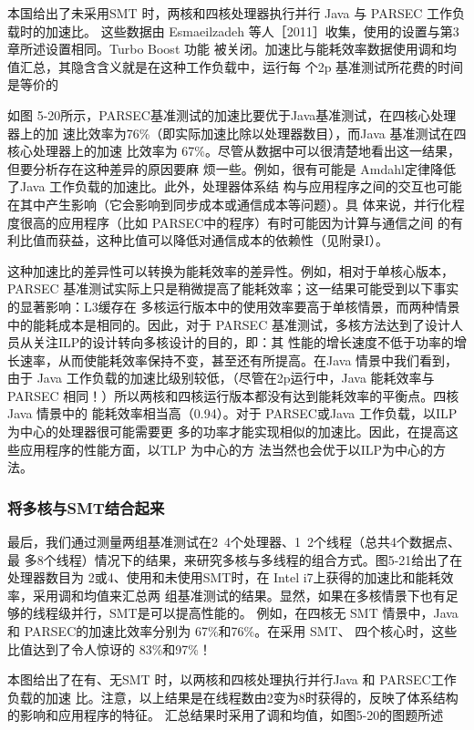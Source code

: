本国给出了未采用SMT 时，两核和四核处理器执行并行 Java 与 PARSEC 工作负载时的加速比。
这些数据由 Esmaeilzadeh 等人［2011］收集，使用的设置与第3章所述设置相同。Turbo Boost 功能
被关闭。加速比与能耗效率数据使用调和均值汇总，其隐含含义就是在这种工作负载中，运行每
个2p 基准测试所花费的时间是等价的

如图 5-20所示，PARSEC基准测试的加速比要优于Java基准测试，在四核心处理器上的加
速比效率为76\%（即实际加速比除以处理器数目），而Java 基准测试在四核心处理器上的加速
比效率为 67\%。尽管从数据中可以很清楚地看出这一结果，但要分析存在这种差异的原因要麻
烦一些。例如，很有可能是 Amdahl定律降低了Java 工作负载的加速比。此外，处理器体系结
构与应用程序之间的交互也可能在其中产生影响（它会影响到同步成本或通信成本等问题）。具
体来说，并行化程度很高的应用程序（比如 PARSEC中的程序）有时可能因为计算与通信之间
的有利比值而获益，这种比值可以降低对通信成本的依赖性（见附录I）。

这种加速比的差异性可以转换为能耗效率的差异性。例如，相对于单核心版本，PARSEC
基准测试实际上只是稍微提高了能耗效率；这一结果可能受到以下事实的显著影响：L3缓存在
多核运行版本中的使用效率要高于单核情景，而两种情景中的能耗成本是相同的。因此，对于
PARSEC 基准测试，多核方法达到了设计人员从关注ILP的设计转向多核设计的目的，即：其
性能的增长速度不低于功率的增长速率，从而使能耗效率保持不变，甚至还有所提高。在Java
情景中我们看到，由于 Java 工作负载的加速比级别较低，（尽管在2p运行中，Java 能耗效率与
PARSEC 相同！）所以两核和四核运行版本都没有达到能耗效率的平衡点。四核 Java 情景中的
能耗效率相当高（0.94）。对于 PARSEC或Java 工作负载，以ILP为中心的处理器很可能需要更
多的功率才能实现相似的加速比。因此，在提高这些应用程序的性能方面，以TLP 为中心的方
法当然也会优于以ILP为中心的方法。

\subsubsection{将多核与SMT结合起来}
最后，我们通过测量两组基准测试在2~4个处理器、1~2个线程（总共4个数据点、最
多8个线程）情况下的结果，来研究多核与多线程的组合方式。图5-21给出了在处理器数目为
2或4、使用和未使用SMT时，在 Intel i7上获得的加速比和能耗效率，采用调和均值来汇总两
组基准测试的结果。显然，如果在多核情景下也有足够的线程级并行，SMT是可以提高性能的。
例如，在四核无 SMT 情景中，Java 和 PARSEC的加速比效率分别为 67\%和76\%。在采用 SMT、
四个核心时，这些比值达到了令人惊讶的 83\%和97\%！

本图给出了在有、无SMT 时，以两核和四核处理执行并行Java 和 PARSEC工作负载的加速
比。注意，以上结果是在线程数由2变为8时获得的，反映了体系结构的影响和应用程序的特征。
汇总结果时采用了调和均值，如图5-20的图题所述

